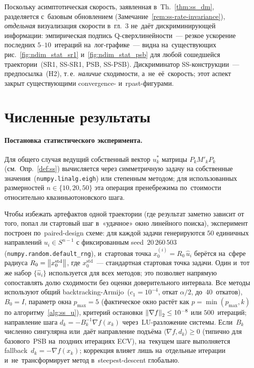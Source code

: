 \begin{remark}\label{rem:ss-rate-empirical}
Поскольку асимптотическая скорость, заявленная в~Th.~\ref{thm:ss_dm},
разделяется с~базовым обновлением (Замечание~\ref{rem:ss-rate-invariance}),
\emph{отдельная} визуализация скорости в~гл.~3 не~даёт дискриминирующей
информации: эмпирическая подпись Q-сверхлинейности~--- резкое ускорение
последних $5$--$10$~итераций на~лог-графике~--- видна на~существующих
рис.~\ref{fig:ndim_stat_sr1} и~\ref{fig:ndim_stat_psb} для любой
сошедшейся траектории~(SR1, SS-SR1, PSB, SS-PSB). Дискриминатор
SS-конструкции~--- предпосылка~(H2), т.\,е.\ \emph{наличие} сходимости,
а~не~её~скорость; этот аспект закрыт существующими convergence-
и~rpast-фигурами.
\end{remark}

\section{Численные результаты}\label{sec:ss_numerics}

\paragraph{Постановка статистического эксперимента.}
\label{par:ssn-stat-setup}
Для общего случая ведущий собственный вектор $u_k^*$ матрицы $P_k M'_k P_k$
(см.\ Опр.~\ref{def:ss}) вычисляется через симметричную задачу на
собственные значения~(\texttt{numpy.linalg.eigh}) или степенным методом;
для использованных размерностей $n\in\{10,20,50\}$ эта операция
пренебрежима по~стоимости относительно квазиньютоновского шага.

Чтобы избежать артефактов одной траектории (где результат заметно
зависит от того, попал ли стартовый шаг в~«удачное» окно линейного
поиска), эксперимент построен по~paired-design схеме: для каждой
задачи генерируются $50$ единичных направлений
$\hat u_i\in S^{n-1}$ с фиксированным seed~$20\,260\,503$
(\texttt{numpy.random.default\_rng}), и~стартовая точка
$x_0^{(i)} = R_0\,\hat u_i$ берётся на~сфере радиуса
$R_0 = \left\|x_0^{\mathrm{std}}\right\|$, где $x_0^{\mathrm{std}}$~--- стандартная
стартовая точка задачи. Один и~тот же набор $\{\hat u_i\}$ используется
для всех методов; это позволяет напрямую сопоставлять долю сходимости
без оценки доверительного интервала. Все методы используют общий
backtracking-Armijo~($c_1=10^{-4}$, откат $\alpha/2$, до~$40$~откатов),
$B_0=I$, параметр окна $p_{\max}=5$ (фактическое окно растёт как
$p=\min(p_{\max},k)$ по алгоритму~\ref{alg:ss_u}), критерий остановки
$\left\|\nabla f\right\|_2\le 10^{-8}$ или $500$~итераций; направление шага
$d_k = -B_k^{-1}\nabla f(x_k)$ через~LU-разложение системы.
Если~$B_k$ численно сингулярна или~даёт направление подъёма
$\langle\nabla f,d_k\rangle\ge 0$ (типично для базового~PSB на~поздних
итерациях ECV), на~текущем шаге выполняется fallback~$d_k=-\nabla f(x_k)$;
коррекция влияет лишь на~отдельные итерации и~не~трансформирует метод
в~steepest-descent глобально.

